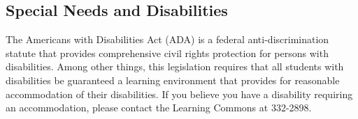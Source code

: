 \subsection*{Special Needs and Disabilities}
The Americans with Disabilities Act (ADA) is a federal anti-discrimination
statute that provides comprehensive civil rights protection for persons
with disabilities. Among other things, this legislation requires that
all students with disabilities be guaranteed a learning environment
that provides for reasonable accommodation of their disabilities.
If you believe  you have a disability requiring an accommodation,
please contact the Learning Commons at 332-2898.


